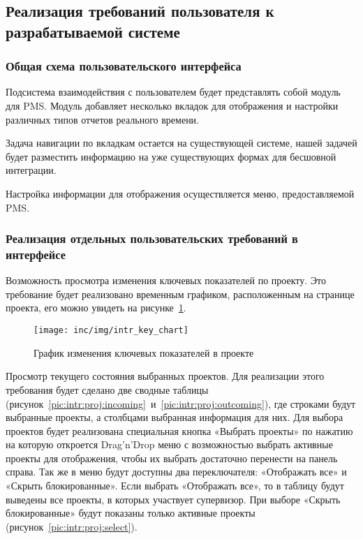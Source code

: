 \subsection{Реализация требований пользователя к разрабатываемой системе}

\subsubsection{Общая схема пользовательского интерфейса}

Подсистема взаимодействия с пользователем %
будет представлять собой модуль для PMS.
Модуль добавляет несколько вкладок для отображения и настройки различных
типов отчетов реального времени.

Задача навигации по вкладкам остается на существующей системе,
нашей задачей будет разместить информацию на уже существующих формах для бесшовной интеграции.

Настройка информации для отображения осуществляется меню, предоставляемой PMS\@.

\subsubsection{Реализация отдельных пользовательских требований в интерфейсе}

Возможность просмотра изменения ключевых показателей по проекту.
Это требование будет реализовано временным графиком, расположенным на странице проекта, его можно увидеть на рисунке~\ref{pic:intr:proj:keyval}.

\begin{figure}[ht]
    \centering
    \texttt{[image: inc/img/intr\_key\_chart]}
    \caption{График изменения ключевых показателей в проекте}
    \label{pic:intr:proj:keyval}
\end{figure}

Просмотр текущего состояния выбранных проектов.
Для реализации этого требования будет сделано две сводные таблицы (рисунок~\ref{pic:intr:proj:incoming}~и~\ref{pic:intr:proj:outcoming}),
где строками будут выбранные проекты, а столбцами выбранная информация для них.
Для выбора проектов будет реализована специальная кнопка «Выбрать проекты»
по нажатию на которую откроется Drag’n’Drop %
меню с возможностью
выбрать активные проекты для отображения,
чтобы их выбрать достаточно перенести на панель справа.
Так же в меню будут доступны два переключателя:
«Отображать все» и «Скрыть блокированные».
Если выбрать «Отображать все», то в таблицу будут выведены все проекты,
в которых участвует супервизор.
При выборе «Скрыть блокированные» будут показаны только активные проекты (рисунок~\ref{pic:intr:proj:select}).

